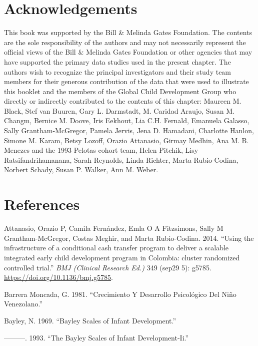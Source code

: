 \documentclass[
]{book}
\begin{document}
\hypertarget{acknowledgements}{%
\chapter{Acknowledgements}\label{acknowledgements}}

This book was supported by the Bill \& Melinda Gates Foundation. The contents are the sole responsibility of the authors and may not necessarily represent the official views of the Bill \& Melinda Gates Foundation or other agencies that may have supported the primary data studies used in the present chapter. The authors wish to recognize the principal investigators and their study team members for their generous contribution of the data that were used to illustrate this booklet and the members of the Global Child Development Group who directly or indirectly contributed to the contents of this chapter: Maureen M. Black, Stef van Buuren, Gary L. Darmstadt, M. Caridad Araujo, Susan M. Changm, Bernice M. Doove, Iris Eekhout, Lia C.H. Fernald, Emanuela Galasso, Sally Grantham-McGregor, Pamela Jervis, Jena D. Hamadani, Charlotte Hanlon, Simone M. Karam, Betsy Lozoff, Orazio Attanasio, Girmay Medhin, Ana M. B. Menezes and the 1993 Pelotas cohort team, Helen Pitchik, Lisy Ratsifandrihamanana, Sarah Reynolds, Linda Richter, Marta Rubio-Codina, Norbert Schady, Susan P. Walker, Ann M. Weber.

\hypertarget{references}{%
\chapter*{References}\label{references}}

\hypertarget{refs}{}
\leavevmode\hypertarget{ref-Attanasio2014}{}%
Attanasio, Orazio P, Camila Fernández, Emla O A Fitzsimons, Sally M Grantham-McGregor, Costas Meghir, and Marta Rubio-Codina. 2014. ``Using the infrastructure of a conditional cash transfer program to deliver a scalable integrated early child development program in Colombia: cluster randomized controlled trial.'' \emph{BMJ (Clinical Research Ed.)} 349 (sep29 5): g5785. \url{https://doi.org/10.1136/bmj.g5785}.

\leavevmode\hypertarget{ref-barrera1981}{}%
Barrera Moncada, G. 1981. ``Crecimiento Y Desarrollo Psicológico Del Niño Venezolano.''

\leavevmode\hypertarget{ref-bayley1969}{}%
Bayley, N. 1969. ``Bayley Scales of Infant Development.''

\leavevmode\hypertarget{ref-bayley1993}{}%
---------. 1993. ``The Bayley Scales of Infant Development-Ii.''
\end{document}
